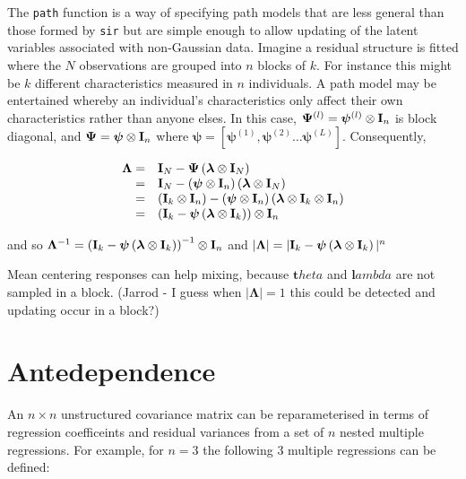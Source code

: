 \documentclass{article}
\begin{document}
The \texttt{path} function is a way of specifying path models that are less general than those formed by \texttt{sir} but are simple enough to allow updating of the latent variables associated with non-Gaussian data. Imagine a residual structure is fitted where the $N$ observations are grouped into $n$ blocks of $k$. For instance this might be $k$ different characteristics measured in $n$ individuals. A path model may be entertained whereby an individual's characteristics only affect their own characteristics rather than anyone elses. In this case, ${\bm \Psi}^{(l)}={\bm \psi}^{(l)}\otimes{\bf I}_{n}$ is block diagonal, and ${\bm \Psi}={\bm \psi}\otimes{\bf I}_{n}$ where ${\bm \psi} = \left[{\bm \psi}^{(1)}, {\bm \psi}^{(2)} \dots {\bm \psi}^{(L)}\right]$. Consequently,

\begin{equation}
\begin{array}{rl}
{\bm \Lambda}=&{\bf I}_{N}-{\bm \Psi}\left({\bm \lambda}\otimes {\bf I}_{N}\right)\\
=&{\bf I}_{N}-\left({\bm \psi}\otimes{\bf I}_{n}\right)\left({\bm \lambda}\otimes {\bf I}_{N}\right)\\
=&\left({\bf I}_{k}\otimes{\bf I}_{n}\right)-\left({\bm \psi}\otimes{\bf I}_{n}\right)\left({\bm \lambda}\otimes {\bf I}_{k}\otimes{\bf I}_{n}\right)\\
=&\left({\bf I}_{k}-{\bm \psi}\left({\bm \lambda}\otimes {\bf I}_{k}\right)\right)\otimes{\bf I}_{n}\\

\end{array}
\end{equation}

and so ${\bm \Lambda}^{-1}=\left({\bf I}_{k}-{\bm \psi}\left({\bm \lambda}\otimes {\bf I}_{k}\right)\right)^{-1}\otimes{\bf I}_{n}$ and $|{\bm \Lambda}| = |{\bf I}_{k}-{\bm \psi}\left({\bm \lambda}\otimes {\bf I}_{k}\right)|^{n}$

Mean centering responses can help mixing, because ${\bm theta}$ and ${\bm lambda}$ are not sampled in a block. (Jarrod - I guess when $|{\bm \Lambda}|=1$ this could be detected and updating occur in a block?)
\section{Antedependence}

An $n\times n$ unstructured covariance matrix can be reparameterised in terms of regression coefficeints and residual variances from a set of $n$ nested multiple regressions. For example, for $n=3$ the following 3 multiple regressions can be defined:
\end{document}
